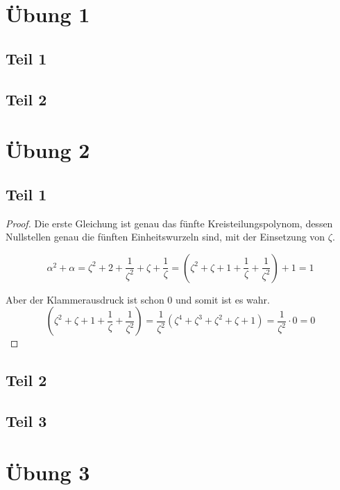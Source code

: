 \documentclass[10pt,a4paper]{article}
\begin{document}
\section{Übung 1}

\subsection{Teil 1}

\subsection{Teil 2}

\section{Übung 2}

\subsection{Teil 1}

\begin{proof}
  Die erste Gleichung ist genau das fünfte Kreisteilungspolynom, dessen Nullstellen genau die fünften Einheitswurzeln sind, mit der Einsetzung von $\zeta$.

  \begin{equation}
    \alpha^{2} + \alpha = \zeta^{2} + 2 + \frac{1}{\zeta^{2}} + \zeta + \frac{1}{\zeta} = (\zeta^{2} + \zeta + 1 + \frac{1}{\zeta}  + \frac{1}{\zeta^{2}}) + 1 = 1
  \end{equation}

  Aber der Klammerausdruck ist schon $0$ und somit ist es wahr.
  \begin{equation}
    (\zeta^{2} + \zeta + 1 + \frac{1}{\zeta}  + \frac{1}{\zeta^{2}}) = \frac{1}{\zeta^{2}}(\zeta^{4} + \zeta^{3} + \zeta^{2} + \zeta + 1) = \frac{1}{\zeta^{2}} \cdot 0 = 0
  \end{equation}
\end{proof}

\subsection{Teil 2}

\subsection{Teil 3}

\section{Übung 3}
\end{document}
